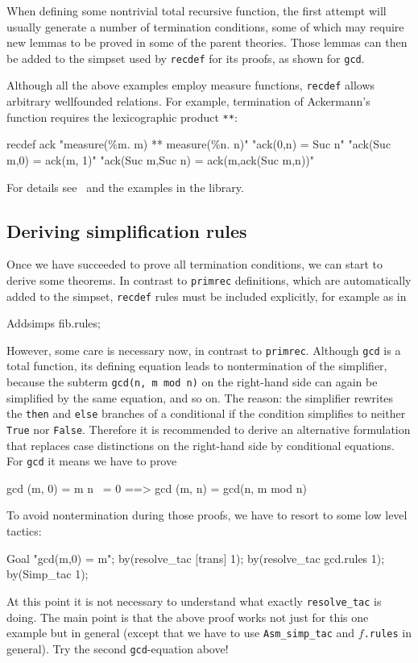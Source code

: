 When defining some nontrivial total recursive function, the first attempt
will usually generate a number of termination conditions, some of which may
require new lemmas to be proved in some of the parent theories. Those lemmas
can then be added to the simpset used by \texttt{recdef} for its
proofs, as shown for \texttt{gcd}.

Although all the above examples employ measure functions, \texttt{recdef}
allows arbitrary wellfounded relations. For example, termination of
Ackermann's function requires the lexicographic product \texttt{**}:
\begin{ttbox}
recdef ack "measure(\%m. m) ** measure(\%n. n)"
    "ack(0,n)         = Suc n"
    "ack(Suc m,0)     = ack(m, 1)"
    "ack(Suc m,Suc n) = ack(m,ack(Suc m,n))"
\end{ttbox}
For details see~\cite{Isa-Logics-Man} and the examples in the library.


\subsection{Deriving simplification rules}

Once we have succeeded to prove all termination conditions, we can start to
derive some theorems. In contrast to \texttt{primrec} definitions, which are
automatically added to the simpset, \texttt{recdef} rules must be included
explicitly, for example as in
\begin{ttbox}
Addsimps fib.rules;
\end{ttbox}
However, some care is necessary now, in contrast to \texttt{primrec}.
Although \texttt{gcd} is a total function, its defining equation leads to
nontermination of the simplifier, because the subterm \texttt{gcd(n, m mod
  n)} on the right-hand side can again be simplified by the same equation,
and so on. The reason: the simplifier rewrites the \texttt{then} and
\texttt{else} branches of a conditional if the condition simplifies to
neither \texttt{True} nor \texttt{False}.  Therefore it is recommended to
derive an alternative formulation that replaces case distinctions on the
right-hand side by conditional equations. For \texttt{gcd} it means we have
to prove
\begin{ttbox}
           gcd (m, 0) = m
n ~= 0 ==> gcd (m, n) = gcd(n, m mod n)
\end{ttbox}
To avoid nontermination during those proofs, we have to resort to some low
level tactics:
\begin{ttbox}
Goal "gcd(m,0) = m";
by(resolve_tac [trans] 1);
by(resolve_tac gcd.rules 1);
by(Simp_tac 1);
\end{ttbox}
At this point it is not necessary to understand what exactly
\texttt{resolve_tac} is doing. The main point is that the above proof works
not just for this one example but in general (except that we have to use
\texttt{Asm_simp_tac} and $f$\texttt{.rules} in general). Try the second
\texttt{gcd}-equation above!


